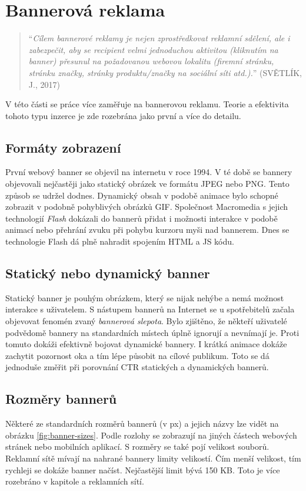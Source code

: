 \section{Bannerová reklama}
    \begin{quote}
        \enquote{\emph{Cílem bannerové reklamy je nejen zprostředkovat reklamní sdělení, ale i zabezpečit, aby se recipient velmi jednoduchou aktivitou
        (kliknutím na banner) přesunul na požadovanou webovou lokalitu (firemní stránku, stránku značky, stránky produktu/značky na sociální síti atd.).}}
        (SVĚTLÍK, J., 2017) \cite{svetlik:reklama}
    \end{quote}

    V této části se práce více zaměřuje na bannerovou reklamu.
    Teorie a efektivita tohoto typu inzerce je zde rozebrána jako první a více do detailu. \cite{banner:advertising}

    \subsection{Formáty zobrazení}
    První webový banner se objevil na internetu v roce 1994. V té době se bannery objevovali nejčastěji jako statický obrázek ve formátu
    JPEG nebo PNG. Tento způsob se udržel dodnes. Dynamický obsah v podobě animace bylo schopné zobrazit v podobně pohyblivých obrázků GIF.
    Společnost Macromedia s jejich technologií \emph{Flash} dokázali do bannerů přidat i možnosti interakce v podobě animací nebo přehrání zvuku při
    pohybu kurzoru myši nad bannerem. Dnes se technologie Flash dá plně nahradit spojením HTML a JS kódu. 

    \subsection{Statický nebo dynamický banner}
    Statický banner je pouhým obrázkem, který se nijak nehýbe a nemá možnost interakce s uživatelem. S nástupem bannerů na Internet se u
    spotřebitelů začala objevovat fenomén zvaný \emph{bannerová slepota}. Bylo zjištěno, že někteří uživatelé podvědomě bannery na standardních místech
    úplně ignorují a nevnímají je. Proti tomuto dokáži efektivně bojovat dynamické bannery.
    I krátká animace dokáže zachytit pozornost oka a tím lépe působit na cílové publikum.
    Toto se dá jednoduše změřit při porovnání CTR statických a dynamických bannerů.

    \subsection{Rozměry bannerů}
    Některé ze standardních rozměrů bannerů (v px) a jejich názvy lze vidět na obrázku \ref{fig:banner-sizes}. Podle rozlohy se zobrazují na jiných částech webových stránek nebo
    mobilních aplikací. S rozměry se také pojí velikost souborů. Reklamní sítě mívají na nahrané bannery limity velikostí.
    Čím menší velikost, tím rychleji se dokáže banner načíst. Nejčastější limit bývá 150 KB. Toto je více rozebráno v kapitole a reklamních sítí.

